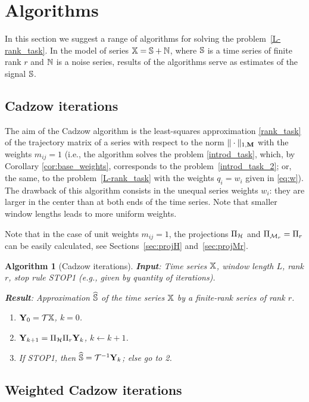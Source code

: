 \documentclass[sii]{ipart}
\newtheorem{algorithm}{Algorithm}
\begin{document}
\section{Algorithms}
\label{sec:alg}
In this section we suggest a range of algorithms for solving the problem~\eqref{L-rank_task}.
In the model of series $\mathbb{X}=\mathbb{S}+\mathbb{N}$, where $\mathbb{S}$ is a time series of finite rank $r$ and $\mathbb{N}$ is a noise series, results of the algorithms serve as  estimates of the signal $\mathbb{S}$.

\subsection{Cadzow iterations}
The aim of the Cadzow algorithm \cite{Cadzow1988} is the least-squares approximation \eqref{rank_task} of the trajectory matrix of a series with respect to the norm $\|\cdot\|_{1, \mathbf{M}}$ with the weights $m_{ij}=1$ (i.e., the algorithm solves the problem \eqref{introd_task}, which, by Corollary \ref{cor:base_weights}, corresponds to the problem~\eqref{introd_task_2}; or, the same, to the problem~\eqref{L-rank_task} with the weights $q_i=w_i$ given in \eqref{eq:w}). The drawback of this algorithm consists in the unequal series weights $w_i$: they are larger in the center than at both ends of the time series. Note that smaller window lengths leads to more uniform weights.

Note that in the case of unit weights $m_{ij}=1$, the projections $\Pi_{\mathcal{H}}$ and $\Pi_{\mathcal{M}_r}=\Pi_{r}$ can be easily calculated, see Sections~\ref{sec:projH}
and~\ref{sec:projMr}.

\begin{algorithm}[Cadzow iterations]
	\textbf{Input}: Time series $\mathbb{X}$, window length $L$, rank $r$,
	stop rule STOP1 (e.g., given by quantity of iterations).
	
	\textbf{Result}:
	Approximation $\widehat{\mathbb{S}}$ of the time series $\mathbb{X}$ by a finite-rank series of rank $r$.
	
	\begin{enumerate}
		\item
		$\mathbf{Y}_0 = \mathcal{T} \mathbb{X}$, $k=0$.
		\item
		$\mathbf{Y}_{k+1} = \Pi_{\mathcal{H}}  \Pi_{r} \mathbf{Y}_{k}$, $k\leftarrow k+1$.
		\item
		If STOP1, then $\widehat{\mathbb{S}} = \mathcal{T}^{-1} \mathbf{Y}_k$; else go to 2.
	\end{enumerate}
\end{algorithm}


\subsection{Weighted Cadzow iterations}
\end{document}
